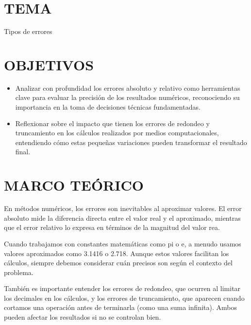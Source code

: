 \documentclass[12pt]{article}
\begin{document}
\section*{TEMA}
{Tipos de errores}

\vspace{0.5cm}

\section*{OBJETIVOS}
\begin{itemize}
    \item {Analizar con profundidad los errores absoluto y relativo como herramientas clave para evaluar la precisión de los resultados numéricos,
     reconociendo su importancia en la toma de decisiones técnicas fundamentadas.}

     \item {Reflexionar sobre el impacto que tienen los errores de redondeo y truncamiento en los cálculos realizados por medios computacionales, 
     entendiendo cómo estas pequeñas variaciones pueden transformar el resultado final.}
\end{itemize}

\vspace{0.5cm}

\section*{MARCO TEÓRICO}
{En métodos numéricos, los errores son inevitables al aproximar valores. El error absoluto mide la diferencia 
directa entre el valor real y el aproximado,
 mientras que el error relativo lo expresa en términos de la magnitud del valor rea.} \cite{burden2015numerico}

  {Cuando trabajamos con constantes matemáticas como pi o e, a menudo usamos valores aproximados como 3.1416 o 2.718.
   Aunque estos valores facilitan los cálculos, siempre debemos considerar 
   cuán precisos son según el contexto del problema.} \cite{chapra2010canale}

  {También es importante entender los errores de redondeo, que ocurren al limitar los decimales en los cálculos,
   y los errores de truncamiento, que aparecen cuando cortamos una operación antes de terminarla (como una suma infinita).
    Ambos pueden afectar los resultados si no se controlan bien. } \cite{upv2023taylor}
 

\vspace{0.5cm}
\end{document}

